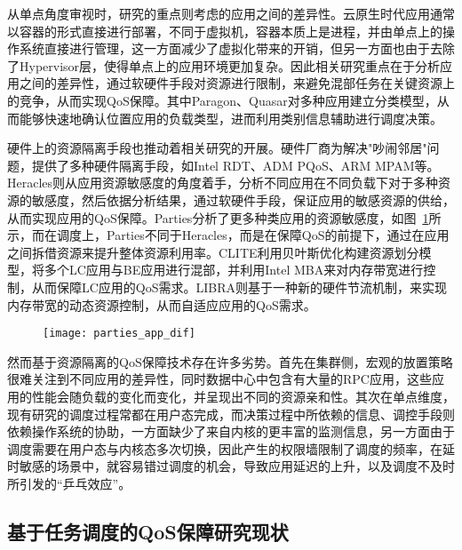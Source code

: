 从单点角度审视时，研究的重点则考虑的应用之间的差异性。云原生时代应用通常以容器的形式直接进行部署，不同于虚拟机，容器本质上是进程，并由单点上的操作系统直接进行管理，这一方面减少了虚拟化带来的开销，但另一方面也由于去除了Hypervisor层，使得单点上的应用环境更加复杂。因此相关研究重点在于分析应用之间的差异性，通过软硬件手段对资源进行限制，来避免混部任务在关键资源上的竞争，从而实现QoS保障。其中Paragon\citep{delimitrou2013paragon}、Quasar\citep{delimitrou2014quasar}对多种应用建立分类模型，从而能够快速地确认位置应用的负载类型，进而利用类别信息辅助进行调度决策。

硬件上的资源隔离手段也推动着相关研究的开展。硬件厂商为解决"吵闹邻居"问题，提供了多种硬件隔离手段，如Intel RDT、ADM PQoS\citep{amdpqos}、ARM MPAM\citep{armmpam}等。Heracles\citep{lo2015heracles}则从应用资源敏感度的角度着手，分析不同应用在不同负载下对于多种资源的敏感度，然后依据分析结果，通过软硬件手段，保证应用的敏感资源的供给，从而实现应用的QoS保障。Parties\citep{chen2019parties}分析了更多种类应用的资源敏感度，如图~\ref{fig:parties_app_dif}所示，而在调度上，Parties不同于Heracles，而是在保障QoS的前提下，通过在应用之间拆借资源来提升整体资源利用率。CLITE\citep{patel2020clite}利用贝叶斯优化构建资源划分模型，将多个LC应用与BE应用进行混部，并利用Intel MBA来对内存带宽进行控制，从而保障LC应用的QoS需求。LIBRA\citep{zhang2021libra}则基于一种新的硬件节流机制，来实现内存带宽的动态资源控制，从而自适应应用的QoS需求。

\begin{figure}[!htbp]
    \centering
    \texttt{[image: parties\_app\_dif]}
    \label{fig:parties_app_dif}
\end{figure}

然而基于资源隔离的QoS保障技术存在许多劣势。首先在集群侧，宏观的放置策略很难关注到不同应用的差异性，同时数据中心中包含有大量的RPC应用，这些应用的性能会随负载的变化而变化，并呈现出不同的资源亲和性。其次在单点维度，现有研究的调度过程常都在用户态完成，而决策过程中所依赖的信息、调控手段则依赖操作系统的协助，一方面缺少了来自内核的更丰富的监测信息，另一方面由于调度需要在用户态与内核态多次切换，因此产生的权限墙限制了调度的频率，在延时敏感的场景中，就容易错过调度的机会，导致应用延迟的上升，以及调度不及时所引发的“乒乓效应”。

\subsection{基于任务调度的QoS保障研究现状}

